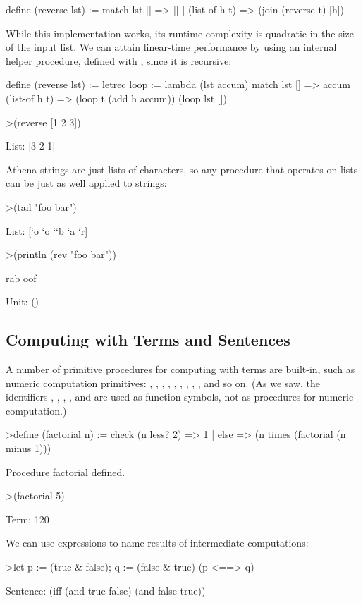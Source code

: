 \begin{tcAthena}
define (reverse lst) := 
  match lst  {
    [] => []
  | (list-of h t) => (join (reverse t) [h])
  }
\end{tcAthena}
While this implementation works, its runtime complexity is quadratic in the size of the input list. We can 
attain linear-time performance by using an internal helper procedure, defined with , since it is recursive: 
\begin{tcAthena}
define (reverse lst) := 
  letrec {loop := lambda (lst accum) 
                    match lst {
                      [] => accum
                    | (list-of h t) => (loop t (add h accum))
                    }}
    (loop lst [])

>(reverse [1 2 3])

List: [3 2 1]
\end{tcAthena}
Athena strings are just lists of characters, so any procedure that operates on lists can be just as well applied to strings:
\begin{tcAthena}
>(tail "foo bar")

List: [`o `o `\blank `b `a `r]

>(println (rev "foo bar"))

rab oof

Unit: ()
\end{tcAthena}

\subsection{Computing with Terms and Sentences}

A number of primitive procedures for computing with terms are built-in, such as numeric computation primitives: , , , 
, , , , , , and so on.
(As we saw, the identifiers \mtt{+}, \mtt{-}, \mtt{*}, \mtt{/}, and \mtt{\%} are used as function symbols, not as procedures for numeric computation.)
\begin{tcAthena}[upquote=true]
>define (factorial n) := 
   check {
     (n less? 2) => 1
   | else => (n times (factorial (n minus 1)))
   }

Procedure factorial defined.

>(factorial 5)

Term: 120
\end{tcAthena}
We can use  expressions to name results of intermediate computations:
\begin{tcAthena}
>let {p := (true & false);
      q := (false & true)}
  (p <==> q)

Sentence: (iff (and true false)
               (and false true))
\end{tcAthena}

